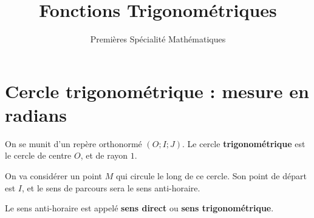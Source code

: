 \documentclass{article}
\title{Fonctions Trigonométriques}
\date{}
\author{Premières Spécialité Mathématiques}
\begin{document}
\maketitle

\section{Cercle trigonométrique : mesure en radians}
On se munit d'un repère orthonormé $(O;I;J)$. Le cercle \textbf{trigonométrique} est le cercle de centre $O$, et de rayon $1$.

\begin{center}
\end{center}
On va considérer un point $M$ qui circule le long de ce cercle. Son point de départ est $I$, et le sens de parcours sera le sens anti-horaire.

\begin{center}
\end{center}

\begin{tcolorbox}
\begin{definition}
Le sens anti-horaire est appelé \textbf{sens direct} ou \textbf{sens trigonométrique}.
\end{definition}
\end{tcolorbox}
\end{document}

